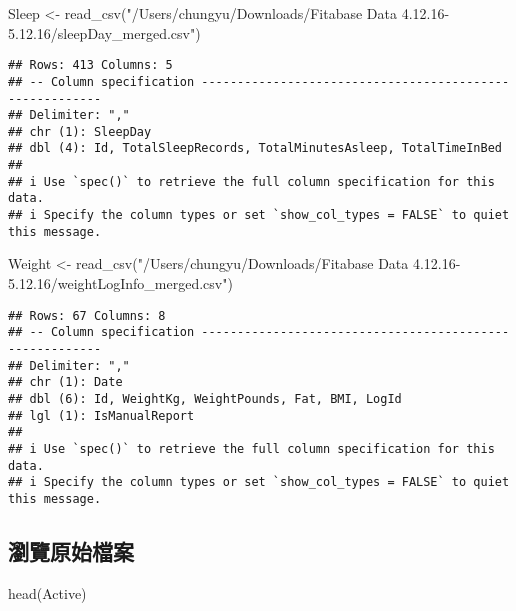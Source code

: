 \documentclass[
]{article}
\newenvironment{Shaded}{\begin{snugshade}}{\end{snugshade}}
\newcommand{\FunctionTok}[1]{\textcolor[rgb]{0.00,0.00,0.00}{#1}}
\newcommand{\NormalTok}[1]{#1}
\newcommand{\OtherTok}[1]{\textcolor[rgb]{0.56,0.35,0.01}{#1}}
\newcommand{\StringTok}[1]{\textcolor[rgb]{0.31,0.60,0.02}{#1}}
\begin{document}
\begin{Shaded}
\begin{Highlighting}[]
\NormalTok{Sleep }\OtherTok{\textless{}{-}} \FunctionTok{read\_csv}\NormalTok{(}\StringTok{"/Users/chungyu/Downloads/Fitabase Data 4.12.16{-}5.12.16/sleepDay\_merged.csv"}\NormalTok{)}
\end{Highlighting}
\end{Shaded}

\begin{verbatim}
## Rows: 413 Columns: 5
## -- Column specification --------------------------------------------------------
## Delimiter: ","
## chr (1): SleepDay
## dbl (4): Id, TotalSleepRecords, TotalMinutesAsleep, TotalTimeInBed
## 
## i Use `spec()` to retrieve the full column specification for this data.
## i Specify the column types or set `show_col_types = FALSE` to quiet this message.
\end{verbatim}

\begin{Shaded}
\begin{Highlighting}[]
\NormalTok{Weight }\OtherTok{\textless{}{-}} \FunctionTok{read\_csv}\NormalTok{(}\StringTok{"/Users/chungyu/Downloads/Fitabase Data 4.12.16{-}5.12.16/weightLogInfo\_merged.csv"}\NormalTok{)}
\end{Highlighting}
\end{Shaded}

\begin{verbatim}
## Rows: 67 Columns: 8
## -- Column specification --------------------------------------------------------
## Delimiter: ","
## chr (1): Date
## dbl (6): Id, WeightKg, WeightPounds, Fat, BMI, LogId
## lgl (1): IsManualReport
## 
## i Use `spec()` to retrieve the full column specification for this data.
## i Specify the column types or set `show_col_types = FALSE` to quiet this message.
\end{verbatim}

\hypertarget{ux700fux89bdux539fux59cbux6a94ux6848}{%
\subsection{瀏覽原始檔案}\label{ux700fux89bdux539fux59cbux6a94ux6848}}

\begin{Shaded}
\begin{Highlighting}[]
\FunctionTok{head}\NormalTok{(Active)}
\end{Highlighting}
\end{Shaded}
\end{document}
